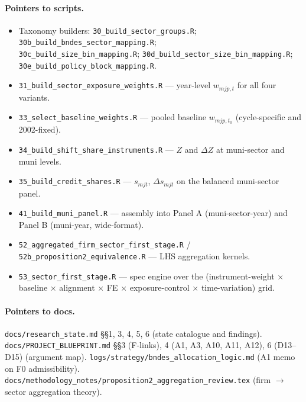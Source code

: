 \documentclass[12pt]{article}
\theoremstyle{definition}
\begin{document}
\paragraph{Pointers to scripts.}
\begin{itemize}[leftmargin=2em, itemsep=1pt]
\item Taxonomy builders: \texttt{30\_build\_sector\_groups.R}; \texttt{30b\_build\_bndes\_sector\_mapping.R}; \\
      \texttt{30c\_build\_size\_bin\_mapping.R}; \texttt{30d\_build\_sector\_size\_bin\_mapping.R}; \\
      \texttt{30e\_build\_policy\_block\_mapping.R}.
\item \texttt{31\_build\_sector\_exposure\_weights.R} --- year-level $w_{m j p, t}$ for all four variants.
\item \texttt{33\_select\_baseline\_weights.R} --- pooled baseline $w_{m j p, t_0}$ (cycle-specific and 2002-fixed).
\item \texttt{34\_build\_shift\_share\_instruments.R} --- $Z$ and $\Delta Z$ at muni-sector and muni levels.
\item \texttt{35\_build\_credit\_shares.R} --- $s_{m j t}$, $\Delta s_{m j t}$ on the balanced muni-sector panel.
\item \texttt{41\_build\_muni\_panel.R} --- assembly into Panel A (muni-sector-year) and Panel B (muni-year, wide-format).
\item \texttt{52\_aggregated\_firm\_sector\_first\_stage.R} / \texttt{52b\_proposition2\_equivalence.R} --- LHS aggregation kernels.
\item \texttt{53\_sector\_first\_stage.R} --- spec engine over the (instrument-weight $\times$ baseline $\times$ alignment $\times$ FE $\times$ exposure-control $\times$ time-variation) grid.
\end{itemize}

\paragraph{Pointers to docs.}
\texttt{docs/research\_state.md} \S\S1, 3, 4, 5, 6 (state catalogue and findings).
\texttt{docs/PROJECT\_BLUEPRINT.md} \S\S3 (F-links), 4 (A1, A3, A10, A11, A12), 6 (D13--D15) (argument map).
\texttt{logs/strategy/bndes\_allocation\_logic.md} (A1 memo on F0 admissibility).
\texttt{docs/methodology\_notes/proposition2\_aggregation\_review.tex} (firm $\to$ sector aggregation theory).
\end{document}
